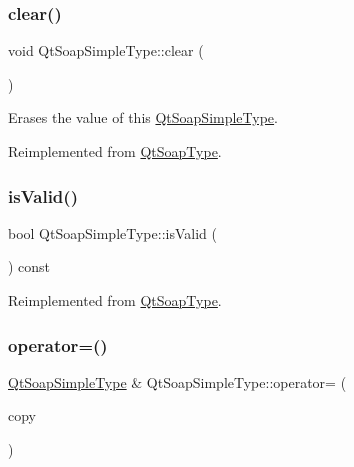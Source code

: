 \subsubsection{\texorpdfstring{clear()}{clear()}}
{\footnotesize\ttfamily void Qt\+Soap\+Simple\+Type\+::clear (\begin{DoxyParamCaption}{ }\end{DoxyParamCaption})\hspace{0.3cm}{\ttfamily [virtual]}}

Erases the value of this \mbox{\hyperlink{class_qt_soap_simple_type}{Qt\+Soap\+Simple\+Type}}. 

Reimplemented from \mbox{\hyperlink{class_qt_soap_type_a9fac9664d334143114c31610ef02c53d}{Qt\+Soap\+Type}}.

\mbox{\label{class_qt_soap_simple_type_aa02758d143c6027bc15a2712e241795c}} 
\subsubsection{\texorpdfstring{is\+Valid()}{isValid()}}
{\footnotesize\ttfamily bool Qt\+Soap\+Simple\+Type\+::is\+Valid (\begin{DoxyParamCaption}{ }\end{DoxyParamCaption}) const\hspace{0.3cm}{\ttfamily [virtual]}}



Reimplemented from \mbox{\hyperlink{class_qt_soap_type_a3b659f89a768ca3503fc86086bb987f6}{Qt\+Soap\+Type}}.

\mbox{\label{class_qt_soap_simple_type_afcf1302fb39398298d76dc9b43b7b82b}} 
\subsubsection{\texorpdfstring{operator=()}{operator=()}}
{\footnotesize\ttfamily \mbox{\hyperlink{class_qt_soap_simple_type}{Qt\+Soap\+Simple\+Type}} \& Qt\+Soap\+Simple\+Type\+::operator= (\begin{DoxyParamCaption}\item[{const \mbox{\hyperlink{class_qt_soap_simple_type}{Qt\+Soap\+Simple\+Type}} \&}]{copy }\end{DoxyParamCaption})}

